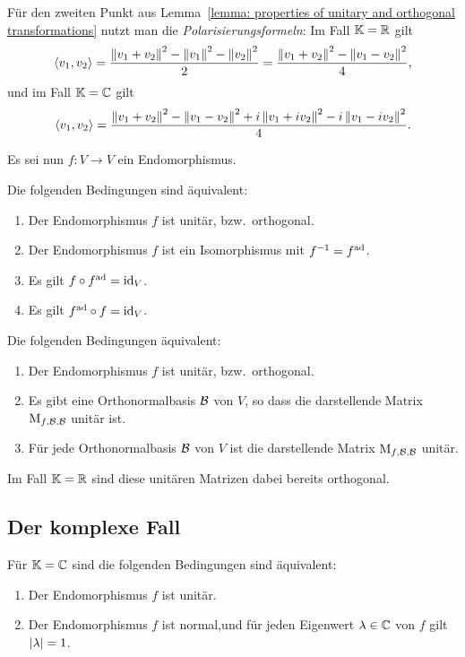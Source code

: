 Für den zweiten Punkt aus Lemma~\ref{lemma: properties of unitary and orthogonal transformations} nutzt man die \emph{Polarisierungsformeln}:
Im Fall $\mathbb{K} = \mathbb{R}$ gilt
\[
    \left\langle v_1, v_2 \right\rangle
  = \frac{ \left\| v_1 + v_2 \right\|^2 - \left\| v_1 \right\|^2 - \left\| v_2 \right\|^2 }{2}
  = \frac{ \left\| v_1 + v_2 \right\|^2 - \left\| v_1 - v_2 \right\|^2 }{4},
\]
und im Fall $\mathbb{K} = \mathbb{C}$ gilt
\[
    \left\langle v_1, v_2 \right\rangle
  = \frac{ \left\| v_1 + v_2 \right\|^2 - \left\| v_1 - v_2 \right\|^2 + i \left\| v_1 + i v_2 \right\|^2 - i \left\| v_1 - i v_2 \right\|^2 }{4}.
\]

Es sei nun $f \colon V \to V$ ein Endomorphismus.

\begin{lemma}
  Die folgenden Bedingungen sind äquivalent:
  \begin{enumerate}
    \item
      Der Endomorphismus $f$ ist unitär, bzw.\ orthogonal.
    \item
      Der Endomorphismus $f$ ist ein Isomorphismus mit $f^{-1} = f^{\operatorname{ad}}$.
    \item
      Es gilt $f \circ f^{\operatorname{ad}} = \operatorname{id}_V$.
    \item
      Es gilt $f^{\operatorname{ad}} \circ f = \operatorname{id}_V$.
  \end{enumerate}
\end{lemma}

\begin{lemma}
  Die folgenden Bedingungen äquivalent:
  \begin{enumerate}
    \item
      Der Endomorphismus $f$ ist unitär, bzw.\ orthogonal.
    \item
      Es gibt eine Orthonormalbasis $\mathcal{B}$ von $V$, so dass die darstellende Matrix $\operatorname{M}_{f, \mathcal{B}, \mathcal{B}}$ unitär ist.
    \item
      Für jede Orthonormalbasis $\mathcal{B}$ von $V$ ist die darstellende Matrix $\operatorname{M}_{f, \mathcal{B}, \mathcal{B}}$ unitär.
  \end{enumerate}
  Im Fall $\mathbb{K} = \mathbb{R}$ sind diese unitären Matrizen dabei bereits orthogonal.
\end{lemma}



\subsection{Der komplexe Fall}

\begin{theorem}
  Für $\mathbb{K} = \mathbb{C}$ sind die folgenden Bedingungen sind äquivalent:
  \begin{enumerate}
    \item
      Der Endomorphismus $f$ ist unitär.
    \item
      Der Endomorphismus $f$ ist normal,und für jeden Eigenwert $\lambda \in \mathbb{C}$ von $f$ gilt $\left| \lambda \right| = 1$.
  \end{enumerate}
\end{theorem}

